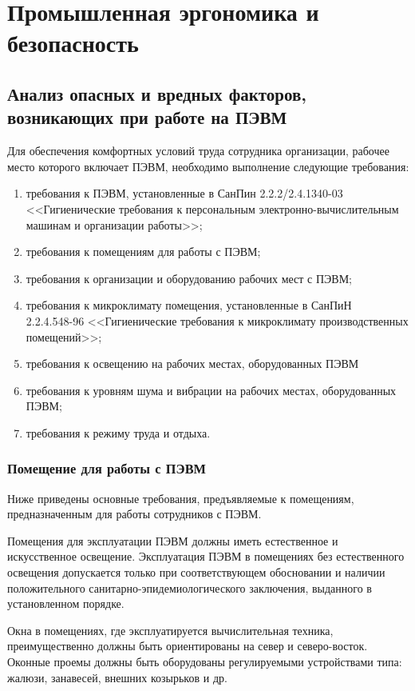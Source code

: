 \newpage

\section{Промышленная эргономика и безопасность}
\subsection{Анализ опасных и вредных факторов, возникающих при работе на ПЭВМ}
Для обеспечения комфортных условий труда сотрудника организации, рабочее место которого включает ПЭВМ, необходимо выполнение следующие требования\cite{SanPinGigiena}:
\begin{enumerate}
\item требования к ПЭВМ, установленные в СанПин 2.2.2/2.4.1340-03 <<Гигиенические требования к персональным электронно-вычислительным машинам и организации работы>>;
\item требования к помещениям для работы с ПЭВМ;
\item требования к организации и оборудованию рабочих мест с ПЭВМ;
\item требования к микроклимату помещения, установленные в  СанПиН \\2.2.4.548-96 <<Гигиенические требования к микроклимату производственных помещений>>;
\item требования к освещению на рабочих местах, оборудованных ПЭВМ
\item требования к уровням шума и вибрации на рабочих местах, оборудованных ПЭВМ;
\item требования к режиму труда и отдыха.
\end{enumerate}

\subsubsection{Помещение для работы с ПЭВМ}

Ниже приведены основные требования, предъявляемые к помещениям, предназначенным для работы сотрудников с ПЭВМ.

Помещения для эксплуатации ПЭВМ должны иметь естественное и искусственное освещение. Эксплуатация ПЭВМ в помещениях без естественного освещения допускается только при соответствующем обосновании и наличии положительного санитарно-эпидемиологического заключения, выданного в установленном порядке.

Окна в помещениях, где эксплуатируется вычислительная техника, преимущественно должны быть ориентированы на север и северо-восток. Оконные проемы должны быть оборудованы регулируемыми устройствами типа: жалюзи, занавесей, внешних козырьков и др.

